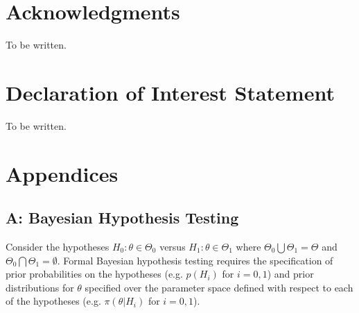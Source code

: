 \documentclass[12pt]{article}
\begin{document}
\section*{Acknowledgments}

To be written.

\section*{Declaration of Interest Statement}
To be written.

  
 		

\newpage
\section*{Appendices}
\subsection*{A: Bayesian Hypothesis Testing}\label{sec:hypothesis}
Consider the hypotheses $H_0:\theta\in\Theta_{0}$ versus $H_1:\theta\in\Theta_{1}$ where $\Theta_{0}\bigcup \Theta_{1} = \Theta$ and $\Theta_{0} \bigcap \Theta_{1} = \emptyset$.
%
Formal Bayesian hypothesis testing requires the specification of prior probabilities on the hypotheses (e.g. $p(H_i)$ for $i=0,1$)
and prior distributions for $\theta$ specified over the parameter space defined with respect to each of the 
hypotheses (e.g. $\pi(\theta \big| H_i)$ for $i=0,1$). 
%
\end{document}
